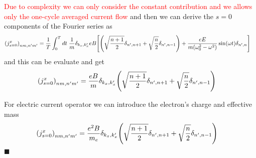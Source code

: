 \textcolor{red}{Due to complexity we can only consider the constant contribution and we allows only the one-cycle averaged current flow} and then we can derive the $s=0$ components of the Fourier series as
\begin{equation} \label{6.14}
  \begin{aligned}
    \qty({j}^x_{s=0})_{nm,n'm'} & =
    \frac{1}{T} \int_0^T dt \;
    \frac{1}{{m}}
    \delta_{k_x,k'_x}
    eB
    \qty[
    \qty(\sqrt{\frac{n+1}{2}} \delta_{n',n+1} + \sqrt{\frac{n}{2}}
    \delta_{n',n-1})
    + \frac{eE}{m(\omega_0^2 - \omega^2)}\sin(\omega t) \delta_{n',n}
    ]
  \end{aligned}
\end{equation}
and this can be evaluate and get
\begin{equation} \label{6.15}
  \begin{aligned}
    \qty({j}^x_{s=0})_{nm,n'm'} & =
    \frac{eB}{{m}}
    \delta_{k_x,k'_x}
    \qty(\sqrt{\frac{n+1}{2}} \delta_{n',n+1} + \sqrt{\frac{n}{2}}
    \delta_{n',n-1})
  \end{aligned}
\end{equation}

\noindent
For electric current operator we can introduce the electron's charge and effective mass
\begin{equation} \label{6.16}
  \begin{aligned}
    \qty({j}^x_{s=0})_{nm,n'm'} & =
    \frac{e^2B}{{m_e}}
    \delta_{k_x,k'_x}
    \qty(\sqrt{\frac{n+1}{2}} \delta_{n',n+1} + \sqrt{\frac{n}{2}}
    \delta_{n',n-1})
  \end{aligned}
\end{equation}
\hfill$\blacksquare$
